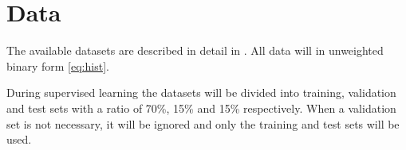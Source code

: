 
\section{Data}

The available datasets are described in detail in . All data will in unweighted binary form \eqref{eq:hist}.

During supervised learning the datasets will be divided into training, validation and test sets with a ratio of 70\%, 15\% and 15\% respectively. When a validation set is not necessary, it will be ignored and only the training and test sets will be used.

